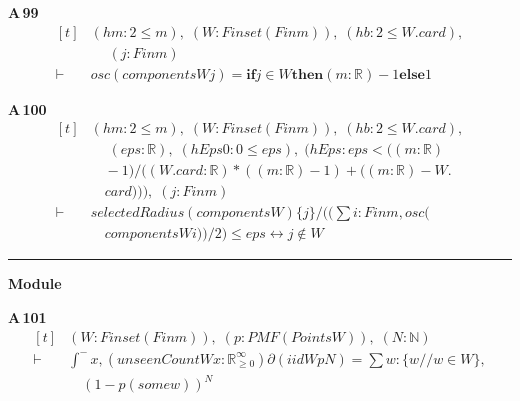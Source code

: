 \noindent\textbf{A\,99}\quad{}
{\footnotesize\[ \begin{aligned}[t]
&(\mathit{hm} : 2 \leq \mathit{m}),\; (\mathit{W} : \mathit{Finset} (\mathit{Fin} \mathit{m})),\; (\mathit{hb} : 2 \leq \mathit{W}.\mathit{card}),\\
&\quad \; (\mathit{j} : \mathit{Fin} \mathit{m})\\
\vdash\;&\mathit{osc} (\mathit{components} \mathit{W} \mathit{j}) = \mathbf{if} \mathit{j} \in \mathit{W} \mathbf{then} (\mathit{m}:\mathbb{R} )-1 \mathbf{else} 1
\end{aligned} \]}

\noindent\textbf{A\,100}\quad{}
{\footnotesize\[ \begin{aligned}[t]
&(\mathit{hm} : 2 \leq \mathit{m}),\; (\mathit{W} : \mathit{Finset} (\mathit{Fin} \mathit{m})),\; (\mathit{hb} : 2 \leq \mathit{W}.\mathit{card}),\\
&\quad \; (\mathit{eps} : \mathbb{R} ),\; (\mathit{hEps0} : 0 \leq \mathit{eps}),\; (\mathit{hEps} : \mathit{eps} < ((\mathit{m}:\mathbb{R} )\\
&\quad -1)/((\mathit{W}.\mathit{card}:\mathbb{R} )*((\mathit{m}:\mathbb{R} )-1) + ((\mathit{m}:\mathbb{R} ) - \mathit{W}.\\
&\quad \mathit{card}))),\; (\mathit{j} : \mathit{Fin} \mathit{m})\\
\vdash\;&\mathit{selectedRadius} (\mathit{components} \mathit{W}) \{ \mathit{j}\} / ((\textstyle\sum \mathit{i} : \mathit{Fin} \mathit{m}, \mathit{osc} (\\
&\quad \mathit{components} \mathit{W} \mathit{i}))/2) \leq \mathit{eps} \leftrightarrow \mathit{j} \notin \mathit{W}
\end{aligned} \]}

\vspace{4pt}\noindent\rule{\columnwidth}{0.4pt}\par\vspace{2pt}
\noindent\textbf{Module }\par\vspace{3pt}

\noindent\textbf{A\,101}\quad{}
{\footnotesize\[ \begin{aligned}[t]
&(\mathit{W} : \mathit{Finset} (\mathit{Fin} \mathit{m})),\; (\mathit{p} : \mathit{PMF} (\mathit{Points} \mathit{W})),\; (\mathit{N} : \mathbb{N} )\\
\vdash\;&\int^{-} \mathit{x}, (\mathit{unseenCount} \mathit{W} \mathit{x} : \mathbb{R}_{\geq0}^{\infty} ) ∂(\mathit{iid} \mathit{W} \mathit{p} \mathit{N}) = \textstyle\sum \mathit{w} : \{ \mathit{w} // \mathit{w} \in \mathit{W}\} ,\\
&\quad (1 - \mathit{p} (\mathit{some} \mathit{w}))^{\mathit{N}}
\end{aligned} \]}

